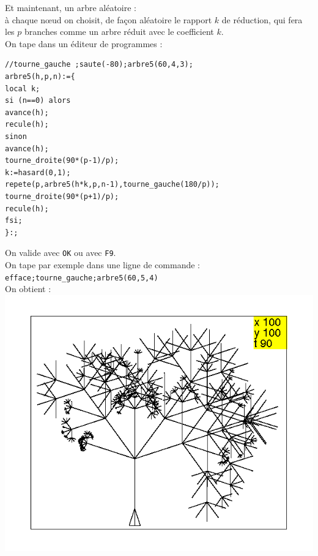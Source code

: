 \documentclass[a4paper,11pt]{book}
\begin{document}
Et maintenant, un arbre al\'eatoire : \\
\`a chaque n{\oe}ud on choisit, de fa\c{c}on al\'eatoire le rapport $k$ de 
r\'eduction, qui fera les $p$ branches comme un arbre r\'eduit avec le 
coefficient $k$.\\
On tape dans un \'editeur de programmes :
\begin{verbatim}
//tourne_gauche ;saute(-80);arbre5(60,4,3);
arbre5(h,p,n):={
local k;
si (n==0) alors
avance(h);
recule(h);
sinon
avance(h);
tourne_droite(90*(p-1)/p);
k:=hasard(0,1);
repete(p,arbre5(h*k,p,n-1),tourne_gauche(180/p));
tourne_droite(90*(p+1)/p);
recule(h);
fsi;
}:;
\end{verbatim}
On valide avec {\tt OK} ou avec {\tt F9}.\\
On tape par exemple dans une ligne de commande :\\
{\tt efface;tourne\_gauche;arbre5(60,5,4)}\\
On obtient :\\
\includegraphics[width=\textwidth]{tortarb5}\\
\end{document}
